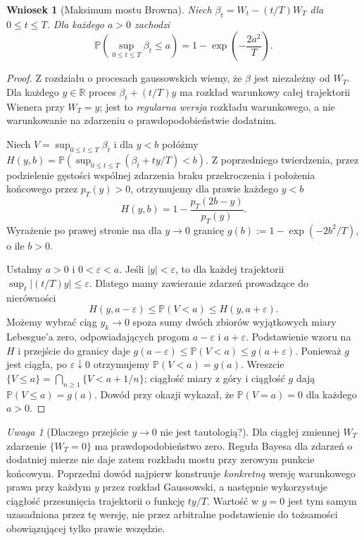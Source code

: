\documentclass[11pt,a4paper,oneside]{report}
\numberwithin{equation}{chapter}
\theoremstyle{plain}
\newtheorem{wniosek}[twierdzenie]{Wniosek}
\theoremstyle{definition}
\theoremstyle{remark}
\newtheorem{uwaga}{Uwaga}[chapter]
\newcommand{\R}{\mathbb{R}}
\newcommand{\Prob}{\mathbb{P}}
\begin{document}
\begin{wniosek}[Maksimum mostu Browna]
Niech $\beta_t=W_t-(t/T)W_T$ dla $0\le t\le T$.
Dla każdego $a>0$ zachodzi
\[
\Prob\left(\sup_{0\le t\le T}\beta_t\le a\right)
=1-\exp\left(-\frac{2a^2}{T}\right).
\]
\end{wniosek}
\begin{proof}
Z rozdziału o procesach gaussowskich wiemy, że $\beta$ jest
niezależny od $W_T$. Dla każdego $y\in\R$ proces
$\beta_t+(t/T)y$ ma rozkład warunkowy całej trajektorii
Wienera przy $W_T=y$; jest to \emph{regularna wersja}
rozkładu warunkowego, a nie warunkowanie na zdarzeniu o
prawdopodobieństwie dodatnim.

Niech $V=\sup_{0\le t\le T}\beta_t$ i dla $y<b$ połóżmy
$H(y,b)=\Prob(\sup_{0\le t\le T}(\beta_t+ty/T)<b)$.
Z poprzedniego twierdzenia, przez podzielenie gęstości
wspólnej zdarzenia braku przekroczenia i położenia końcowego
przez $p_T(y)>0$, otrzymujemy dla prawie każdego $y<b$
\[
H(y,b)=1-\frac{p_T(2b-y)}{p_T(y)}.
\]
Wyrażenie po prawej stronie ma dla $y\to0$ granicę
$g(b):=1-\exp(-2b^2/T)$, o ile $b>0$.

Ustalmy $a>0$ i $0<\varepsilon<a$. Jeśli $|y|<\varepsilon$,
to dla każdej trajektorii $\sup_t|(t/T)y|\le\varepsilon$.
Dlatego mamy zawieranie zdarzeń prowadzące do nierówności
\[
H(y,a-\varepsilon)\le\Prob(V<a)
\le H(y,a+\varepsilon).
\]
Możemy wybrać ciąg $y_k\to0$ spoza sumy dwóch zbiorów
wyjątkowych miary Lebesgue'a zero, odpowiadających progom
$a-\varepsilon$ i $a+\varepsilon$. Podstawienie wzoru
na $H$ i przejście do granicy daje
$g(a-\varepsilon)\le\Prob(V<a)\le g(a+\varepsilon)$.
Ponieważ $g$ jest ciągła, po $\varepsilon\downarrow0$
otrzymujemy $\Prob(V<a)=g(a)$. Wreszcie
$\{V\le a\}=\bigcap_{n\ge1}\{V<a+1/n\}$;
ciągłość miary z góry i ciągłość $g$ dają
$\Prob(V\le a)=g(a)$. Dowód przy okazji wykazał,
że $\Prob(V=a)=0$ dla każdego $a>0$.
\end{proof}


\begin{uwaga}[Dlaczego przejście $y\to0$ nie jest tautologią?]
Dla ciągłej zmiennej $W_T$ zdarzenie $\{W_T=0\}$ ma
prawdopodobieństwo zero. Reguła Bayesa dla zdarzeń o dodatniej
mierze nie daje zatem rozkładu mostu przy zerowym punkcie
końcowym. Poprzedni dowód najpierw konstruuje \emph{konkretną}
wersję warunkowego prawa przy każdym $y$ przez rozkład
Gaussowski, a następnie wykorzystuje ciągłość przesunięcia
trajektorii o funkcję $ty/T$. Wartość w $y=0$ jest tym
samym uzasadniona przez tę wersję, nie przez arbitralne
podstawienie do tożsamości obowiązującej tylko prawie wszędzie.
\end{uwaga}
\end{document}
